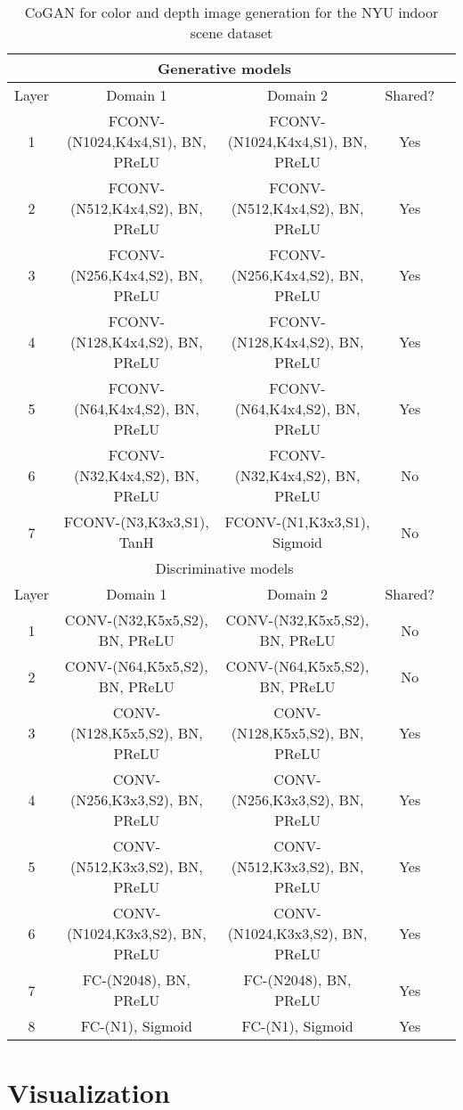 \documentclass{article}
\begin{document}
\begin{table*}[thb!]
\small
\centering
{
\caption{CoGAN for color and depth image generation for the NYU indoor scene dataset}
\label{tbl::nyu_g}
\begin{tabular}{|c|c|c|c|c|}
\hline
\multicolumn{4}{|c|}{Generative models}\\
\hline\rule{0pt}{2ex}    
Layer &  Domain 1 & Domain 2 & Shared? \\
\hline
1 &  FCONV-(N1024,K4x4,S1), BN, PReLU & FCONV-(N1024,K4x4,S1), BN, PReLU & Yes\\
2 &  FCONV-(N512,K4x4,S2), BN, PReLU & FCONV-(N512,K4x4,S2), BN, PReLU & Yes\\
3 &  FCONV-(N256,K4x4,S2), BN, PReLU & FCONV-(N256,K4x4,S2), BN, PReLU & Yes\\
4 &  FCONV-(N128,K4x4,S2), BN, PReLU & FCONV-(N128,K4x4,S2), BN, PReLU & Yes\\
5 &  FCONV-(N64,K4x4,S2), BN, PReLU & FCONV-(N64,K4x4,S2), BN, PReLU & Yes\\
6 &  FCONV-(N32,K4x4,S2), BN, PReLU & FCONV-(N32,K4x4,S2), BN, PReLU & No\\
7 &  FCONV-(N3,K3x3,S1), TanH & FCONV-(N1,K3x3,S1), Sigmoid & No\\
\hline
\hline
\multicolumn{4}{|c|}{Discriminative models}\\
\hline\rule{0pt}{2ex} 
Layer &  Domain 1 & Domain 2 & Shared? \\
\hline
1 & CONV-(N32,K5x5,S2), BN, PReLU & CONV-(N32,K5x5,S2), BN, PReLU &No\\
2 & CONV-(N64,K5x5,S2), BN, PReLU & CONV-(N64,K5x5,S2), BN, PReLU &No\\
3 & CONV-(N128,K5x5,S2), BN, PReLU & CONV-(N128,K5x5,S2), BN, PReLU &Yes\\
4 & CONV-(N256,K3x3,S2), BN, PReLU & CONV-(N256,K3x3,S2), BN, PReLU &Yes\\
5 & CONV-(N512,K3x3,S2), BN, PReLU & CONV-(N512,K3x3,S2), BN, PReLU &Yes\\
6 & CONV-(N1024,K3x3,S2), BN, PReLU & CONV-(N1024,K3x3,S2), BN, PReLU &Yes\\
7 & FC-(N2048), BN, PReLU & FC-(N2048), BN, PReLU &Yes\\
8 & FC-(N1), Sigmoid & FC-(N1), Sigmoid &Yes\\
\hline
\end{tabular}
}
\end{table*}

\clearpage \section{Visualization}\label{subsec::dual_vis}
\end{document}
